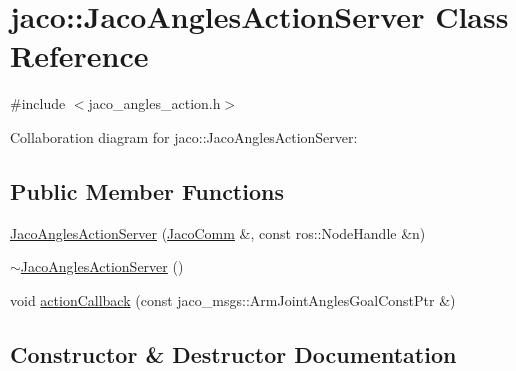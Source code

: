 \hypertarget{classjaco_1_1_jaco_angles_action_server}{}\section{jaco\+:\+:Jaco\+Angles\+Action\+Server Class Reference}
\label{classjaco_1_1_jaco_angles_action_server}


{\ttfamily \#include $<$jaco\+\_\+angles\+\_\+action.\+h$>$}



Collaboration diagram for jaco\+:\+:Jaco\+Angles\+Action\+Server\+:
\subsection*{Public Member Functions}
\begin{DoxyCompactItemize}
\item 
\hyperlink{classjaco_1_1_jaco_angles_action_server_a53ddba342c38bb3d9cf34ad773d7189f}{Jaco\+Angles\+Action\+Server} (\hyperlink{classjaco_1_1_jaco_comm}{Jaco\+Comm} \&, const ros\+::\+Node\+Handle \&n)
\item 
\hyperlink{classjaco_1_1_jaco_angles_action_server_a6d6ed0c99c45e1eebab14bba3233580e}{$\sim$\+Jaco\+Angles\+Action\+Server} ()
\item 
void \hyperlink{classjaco_1_1_jaco_angles_action_server_a3a3da8fd412f2311534246d2287a5b90}{action\+Callback} (const jaco\+\_\+msgs\+::\+Arm\+Joint\+Angles\+Goal\+Const\+Ptr \&)
\end{DoxyCompactItemize}


\subsection{Constructor \& Destructor Documentation}
